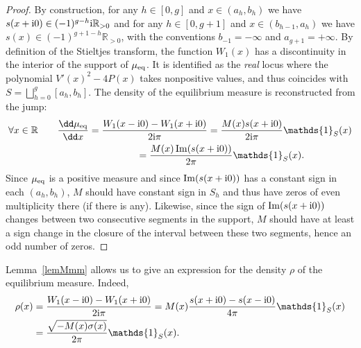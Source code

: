 \documentclass[pdftex]{sigma}
\numberwithin{equation}{section}
\newcommand{\ind}{\mathds{1}}
\begin{document}
\begin{proof}
By construction, for any $h \in [0,g]$ and $x \in (a_h,b_h)$ we have $s(x + {\rm i}0) \in (-1)^{g -h}{\rm i}\mathbb{R}_{> 0}$ and for any $h \in [0,g + 1]$ and $x \in (b_{h - 1},a_h)$ we have $s(x) \in (-1)^{g + 1 - h}\mathbb{R}_{> 0}$, with the conventions $b_{-1} = -\infty$ and $a_{g + 1} = +\infty$. By definition of the Stieltjes transform, the function $W_1(x)$ has a discontinuity in the interior of the support of $\mu_{{\rm eq}}$. It is identified as the \emph{real} locus where the polynomial $V'(x)^2 - 4P(x)$ takes nonpositive values, and thus coincides with $S = \bigsqcup_{h = 0}^{g} [a_h,b_h]$. The density of the equilibrium measure is reconstructed from the jump:
\begin{gather*}
\forall x \in \mathbb{R} \qquad \frac{\dd\mu_{{\rm eq}}}{\dd x} = \frac{W_1(x - {\rm i}0) - W_1(x + {\rm i}0)}{2{\rm i} \pi} = \frac{M(x)s(x + {\rm i}0)}{2{\rm i}\pi}\ind_{S}(x) \\
\hphantom{\forall x \in \mathbb{R}\qquad \frac{\dd\mu_{{\rm eq}}}{\dd x}}{}
 = \frac{M(x) \operatorname{Im}(s(x + {\rm i}0))}{2\pi}\ind_S(x).
\end{gather*}
Since $\mu_{{\rm eq}}$ is a positive measure and since $\operatorname{Im}(s(x + {\rm i}0))$ has a constant sign in each $(a_h,b_h)$, $M$ should have constant sign in $S_h$ and thus have zeros of even multiplicity there (if there is any). Likewise, since the sign of $\operatorname{Im}(s(x + {\rm i}0))$ changes between two consecutive segments in the support, $M$ should have at least a sign change in the closure of the interval between these two segments, hence an odd number of zeros.
\end{proof}

Lemma~\ref{lemMmm} allows us to give an expression for the
density $\rho$ of the equilibrium measure. Indeed,
\begin{align*}%
 \rho(x) & = \frac{W_{1}(x -{\rm i}0) - W_{1}(x + {\rm i}0)}{2{\rm i}\pi} = M(x)\frac{s(x+{\rm i}0)-s(x-{\rm i}0)}{4\pi}\ind_{S}(x) \\
 & = \frac{\sqrt{-M(x)\sigma(x)}}{2\pi}\ind_{S}(x).
\end{align*}
\end{document}

